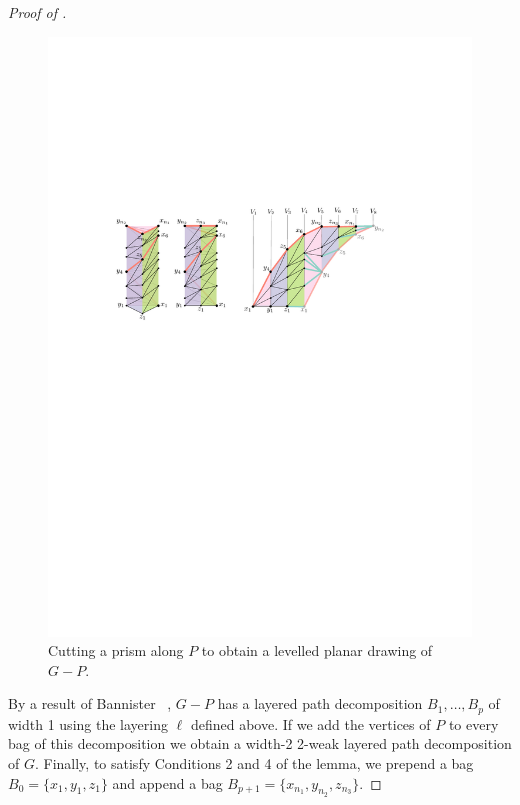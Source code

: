 \documentclass{patmorin}
\begin{document}
\begin{proof}[Proof of ]

  \begin{figure}
   \begin{center}
      \includegraphics[width=0.95\columnwidth]{figs/prism}
   \end{center}
   \caption{Cutting a prism along $P$ to obtain a levelled planar
    drawing of $G-P$.}
  \end{figure}


  By a result of Bannister \etal\ \cite[Proof of
  Theorem~5]{bannister2018track}, $G-P$ has a layered
  path decomposition $B_1,\ldots,B_p$ of width 1 using the layering
  $\ell$ defined above.  If we add the vertices of $P$ to every bag
  of this decomposition we obtain a width-2 2-weak layered path
  decomposition of $G$.  Finally, to satisfy Conditions 2 and 4 of
  the lemma, we prepend a bag $B_0=\{x_1,y_1,z_1\}$ and append a bag
  $B_{p+1}=\{x_{n_1},y_{n_2},z_{n_3}\}$.
\end{proof}
\end{document}
